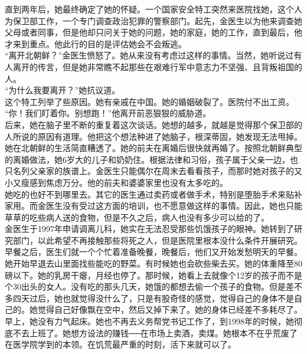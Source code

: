 直到两年后，她最终确定了她的怀疑。一个国家安全特工突然来医院找她，这个人为保卫部工作，一个专门调查政治犯罪的警察部门。起先，金医生以为他来调查她父母或者同事，但是他却只问关于她的问题，她的家庭，她的工作，直到最后，他才来到重点。他此行的目的是评估她会不会叛逃。\\

“离开北朝鲜？”金医生愤怒了。她从来没有考虑过这样的事情。当然，她听说过有人离开的传言，但是她非常瞧不起那些在艰难行军中意志力不坚强、且背叛祖国的人。\\

“为什么我要离开？”她抗议道。\\

这个特工列举了些原因。她有亲戚在中国。她的婚姻破裂了。医院付不出工资。\\

“你！我们盯着你。别想跑！”他离开前恶狠狠的威胁道。\\

后来，她在脑子里不断的重复着这次谈话。她想的越多，就越是觉得那个保卫部的人所说的原因有道理。他把这个想法种进了她脑子，根深蒂固，她发现无法甩掉。\\

她在北朝鲜的生活简直糟透了。她的前夫在离婚后很快就再婚了。按照北朝鲜典型的离婚做法，她6岁大的儿子和奶奶住。根据法律和习俗，孩子属于父亲一边，也只名列父亲家的族谱上。金医生只能偶尔在周末去看看孩子，而那时她对孩子的又小又瘦感到焦虑万分。他的前夫和婆婆家里也没有太多吃的。\\

她吃的也好不到哪里去。其它的医生通过卖药或者做手术，特别是堕胎手术来贴补家用。而金医生没有受过这方面的培训，也不愿意做这样的事情。因此，她也只能草草的吃些病人送的食物，但是不久之后，病人也没有多少可以给的了。\\

金医生于1997年申请调离儿科，她实在无法忍受那些饥饿孩子的眼神。她转到了研究部门，以此希望不再接触那些将死之人，但是医院里根本没什么条件开展研究。早餐之后，医生们就一个个忙着准备晚餐，晚餐后，他们又开始发愁明天的早餐。她开始早退去山里面找些能吃的野菜。有时候她也会砍些柴去买。她的体重降至80磅以下。她的乳房干瘪，月经也停了。那时候，她看上去就像个12岁的孩子而不是个30出头的女人。没有吃的那头几天，她饿的都想去偷一个孩子的食物。但是差不多四天过后，她也就觉得没什么了，只是有股奇怪的感觉，觉得自己的身体不是自己的。她觉得自己好像飘在空中，然后又掉下来了。她的身体已经差不多耗尽了。早上，她没有力气起床。她也不再去义务帮党书记工作了，到1998年的时候，她彻底不去上班了。她想方设法的赚钱──在市场上卖酒，卖煤。她根本不在乎荒废了在医学院学到的本领。在饥荒最严重的时刻，活下来就可以了。\\

